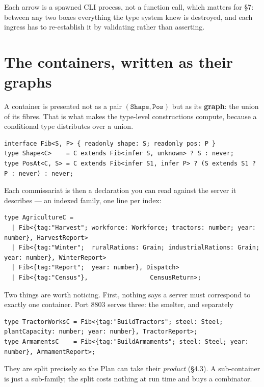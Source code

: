 \documentclass[11pt,a4paper]{article}
\begin{document}
\noindent Each arrow is a spawned CLI process, not a function call, which
matters for \S7: between any two boxes everything the type system knew is
destroyed, and each ingress has to re-establish it by validating rather than
asserting.

\section{The containers, written as their graphs}

A container is presented not as a pair $(\texttt{Shape}, \texttt{Pos})$ but as
its \textbf{graph}: the union of its fibres. That is what makes the type-level
constructions compute, because a conditional type distributes over a union.

\begin{lstlisting}[language=TS]
interface Fib<S, P> { readonly shape: S; readonly pos: P }
type Shape<C>    = C extends Fib<infer S, unknown> ? S : never;
type PosAt<C, S> = C extends Fib<infer S1, infer P> ? (S extends S1 ? P : never) : never;
\end{lstlisting}

\noindent Each commissariat is then a declaration you can read against the
server it describes --- an indexed family, one line per index:

\begin{lstlisting}[language=TS]
type AgricultureC =
  | Fib<{tag:"Harvest"; workforce: Workforce; tractors: number; year: number}, HarvestReport>
  | Fib<{tag:"Winter";  ruralRations: Grain; industrialRations: Grain; year: number}, WinterReport>
  | Fib<{tag:"Report";  year: number}, Dispatch>
  | Fib<{tag:"Census"},                 CensusReturn>;
\end{lstlisting}

Two things are worth noticing. First, nothing says a server must correspond to
exactly one container. Port 8803 serves three: the smelter, and separately

\begin{lstlisting}[language=TS]
type TractorWorksC = Fib<{tag:"BuildTractors"; steel: Steel; plantCapacity: number; year: number}, TractorReport>;
type ArmamentsC    = Fib<{tag:"BuildArmaments"; steel: Steel; year: number}, ArmamentReport>;
\end{lstlisting}

\noindent They are split precisely so the Plan can take their \emph{product}
(\S4.3). A sub-container is just a sub-family; the split costs nothing at run
time and buys a combinator.
\end{document}
